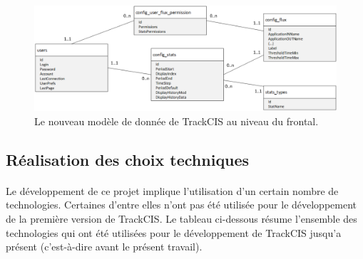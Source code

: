 			\begin{figure}[H]
				\centering
				\includegraphics[width=16cm]{../img/part3/modele_donnee.png}
				\caption{\label{modele_donnee} Le nouveau modèle de donnée de TrackCIS au
				niveau du frontal.}
			\end{figure}
			
		\subsection{Réalisation des choix techniques}
			\paragraph{}%
			Le développement de ce projet implique l'utilisation d'un certain nombre de
			technologies. Certaines d'entre elles n'ont pas été utilisée pour le
			développement de la première version de TrackCIS.
			Le tableau ci-dessous résume l'ensemble des technologies qui ont été
			utilisées pour le développement de TrackCIS jusqu'a présent (c'est-à-dire
			avant le présent travail).
			
